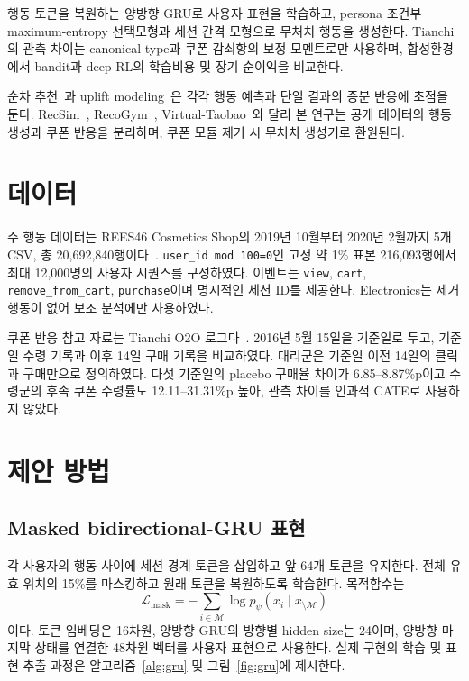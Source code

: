 \documentclass[9pt,twocolumn]{extarticle}
\begin{document}
행동 토큰을 복원하는 양방향 GRU로 사용자 표현을 학습하고, persona 조건부
maximum-entropy 선택모형과 세션 간격 모형으로 무처치 행동을 생성한다. Tianchi의
관측 차이는 canonical type과 쿠폰 감쇠항의 보정 모멘트로만 사용하며, 합성환경에서
bandit과 deep RL의 학습비용 및 장기 순이익을 비교한다.

순차 추천~\cite{sun2019}과 uplift modeling~\cite{devriendt2018}은 각각 행동 예측과
단일 결과의 증분 반응에 초점을 둔다. RecSim~\cite{ie2019}, RecoGym~\cite{rohde2018},
Virtual-Taobao~\cite{shi2019}와 달리 본 연구는 공개 데이터의 행동 생성과 쿠폰 반응을
분리하며, 쿠폰 모듈 제거 시 무처치 생성기로 환원된다.

\section{데이터}
주 행동 데이터는 REES46 Cosmetics Shop의 2019년 10월부터 2020년 2월까지 5개
CSV, 총 20,692,840행이다~\cite{rees46}. \texttt{user\_id mod 100=0}인 고정 약
1\% 표본 216,093행에서 최대 12,000명의 사용자 시퀀스를 구성하였다. 이벤트는
\texttt{view}, \texttt{cart}, \texttt{remove\_from\_cart}, \texttt{purchase}이며
명시적인 세션 ID를 제공한다. Electronics는 제거 행동이 없어 보조 분석에만 사용하였다.

쿠폰 반응 참고 자료는 Tianchi O2O 로그다~\cite{tianchi}. 2016년 5월 15일을 기준일로
두고, 기준일 수령 기록과 이후 14일 구매 기록을 비교하였다. 대리군은 기준일 이전
14일의 클릭과 구매만으로 정의하였다. 다섯 기준일의 placebo 구매율 차이가
6.85--8.87\%p이고 수령군의 후속 쿠폰 수령률도 12.11--31.31\%p 높아, 관측 차이를
인과적 CATE로 사용하지 않았다.

\section{제안 방법}
\subsection{Masked bidirectional-GRU 표현}
각 사용자의 행동 사이에 세션 경계 토큰을 삽입하고 앞 64개 토큰을 유지한다. 전체
유효 위치의 15\%를 마스킹하고 원래 토큰을 복원하도록 학습한다. 목적함수는
\begin{equation}
\mathcal{L}_{\mathrm{mask}}
=-\sum_{i\in\mathcal{M}}\log p_\psi(x_i\mid x_{\setminus\mathcal{M}})
\end{equation}
이다. 토큰 임베딩은 16차원, 양방향 GRU의 방향별 hidden size는 24이며, 양방향
마지막 상태를 연결한 48차원 벡터를 사용자 표현으로 사용한다. 실제 구현의 학습 및
표현 추출 과정은 알고리즘~\ref{alg:gru} 및 그림~\ref{fig:gru}에 제시한다.
\end{document}
